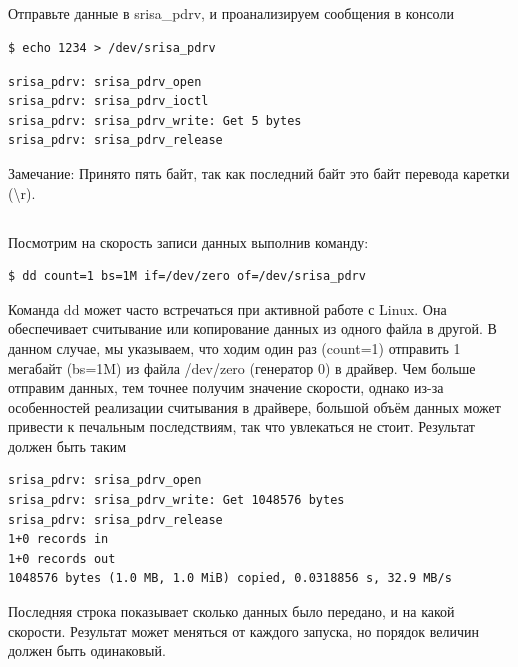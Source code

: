\subsection{} Отправьте данные в srisa\_pdrv, и проанализируем сообщения в консоли
\begin{lstlisting}[style=bash]
$ echo 1234 > /dev/srisa_pdrv
\end{lstlisting}
\begin{lstlisting}[style=stdout]
srisa_pdrv: srisa_pdrv_open
srisa_pdrv: srisa_pdrv_ioctl
srisa_pdrv: srisa_pdrv_write: Get 5 bytes
srisa_pdrv: srisa_pdrv_release
\end{lstlisting} 

\vspace{3mm}
\begin{Notes}{Замечание:} 
	Принято пять байт, так как последний байт это байт перевода каретки (\textbackslash{}r). 
\end{Notes}
	
\subsection{}Посмотрим на скорость записи данных выполнив команду:
\begin{lstlisting}[style=bash]
$ dd count=1 bs=1M if=/dev/zero of=/dev/srisa_pdrv 
\end{lstlisting}
Команда dd может часто встречаться при активной работе с Linux. Она обеспечивает считывание или копирование данных из одного файла в другой. В данном случае, мы указываем, что ходим один раз (count=1) отправить 1 мегабайт (bs=1M)  из файла /dev/zero (генератор 0) в драйвер. Чем больше отправим данных, тем точнее получим значение скорости, однако из-за особенностей реализации считывания в драйвере, большой объём данных может привести к печальным последствиям, так что увлекаться не стоит. Результат должен быть таким
\begin{lstlisting}[style=stdout]
srisa_pdrv: srisa_pdrv_open
srisa_pdrv: srisa_pdrv_write: Get 1048576 bytes
srisa_pdrv: srisa_pdrv_release 
1+0 records in
1+0 records out
1048576 bytes (1.0 MB, 1.0 MiB) copied, 0.0318856 s, 32.9 MB/s
\end{lstlisting}
Последняя строка показывает сколько данных было передано, и на какой скорости. Результат может меняться от каждого запуска, но порядок величин должен быть одинаковый.

